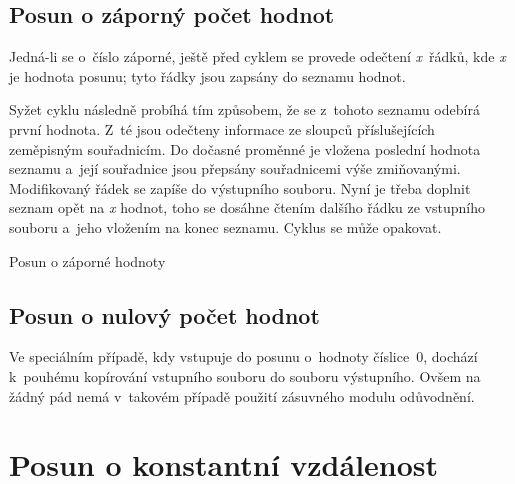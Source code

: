 \subsection{Posun o záporný počet hodnot}
\label{zapornehodnoty}

Jedná-li se o~číslo záporné, ještě před cyklem se provede odečtení \textit{x}~řádků,
kde \textit{x} je hodnota posunu; tyto řádky jsou zapsány do seznamu hodnot.

Syžet cyklu následně probíhá
tím způsobem, že se z~tohoto seznamu odebírá první hodnota. Z~té jsou odečteny informace ze
sloupců příslušejících zeměpisným souřadnicím. Do dočasné proměnné je vložena poslední
hodnota seznamu a~její souřadnice jsou pře\-psány souřadnicemi výše zmiňovanými. Modifikovaný řádek
se zapíše do výstupního souboru. Nyní je třeba doplnit seznam opět na \textit{x} hodnot, toho
se dosáhne čtením dalšího řádku ze vstupního souboru a~jeho vložením na konec seznamu. Cyklus
se může opakovat. 

\begin{algorithm}
\label{fig:pseudozapornehodnoty}
\caption{Posun o záporné hodnoty}
    \begin{algorithmic}[1]
    \ENDWHILE
    \end{algorithmic}
\end{algorithm}

\subsection{Posun o nulový počet hodnot}
\label{nulovehodnoty}

Ve speciálním případě, kdy vstupuje do posunu o~hodnoty číslice~0,
dochází k~pouhé\-mu kopírování vstupního
souboru do souboru výstupního. Ovšem na žádný pád nemá v~takovém případě použití zásuvného modulu
odůvodnění. 

\section{Posun o konstantní vzdálenost}
\label{by_distance}

